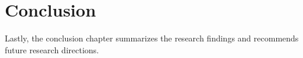 \chapter{Conclusion}
Lastly, the conclusion chapter summarizes the research findings and recommends future research directions.

